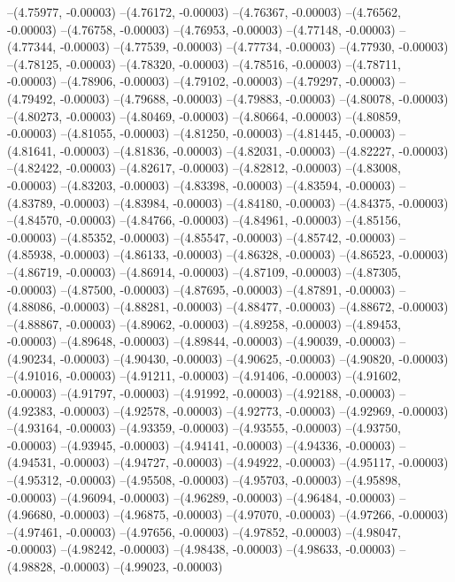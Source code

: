 --(4.75977, -0.00003)
--(4.76172, -0.00003)
--(4.76367, -0.00003)
--(4.76562, -0.00003)
--(4.76758, -0.00003)
--(4.76953, -0.00003)
--(4.77148, -0.00003)
--(4.77344, -0.00003)
--(4.77539, -0.00003)
--(4.77734, -0.00003)
--(4.77930, -0.00003)
--(4.78125, -0.00003)
--(4.78320, -0.00003)
--(4.78516, -0.00003)
--(4.78711, -0.00003)
--(4.78906, -0.00003)
--(4.79102, -0.00003)
--(4.79297, -0.00003)
--(4.79492, -0.00003)
--(4.79688, -0.00003)
--(4.79883, -0.00003)
--(4.80078, -0.00003)
--(4.80273, -0.00003)
--(4.80469, -0.00003)
--(4.80664, -0.00003)
--(4.80859, -0.00003)
--(4.81055, -0.00003)
--(4.81250, -0.00003)
--(4.81445, -0.00003)
--(4.81641, -0.00003)
--(4.81836, -0.00003)
--(4.82031, -0.00003)
--(4.82227, -0.00003)
--(4.82422, -0.00003)
--(4.82617, -0.00003)
--(4.82812, -0.00003)
--(4.83008, -0.00003)
--(4.83203, -0.00003)
--(4.83398, -0.00003)
--(4.83594, -0.00003)
--(4.83789, -0.00003)
--(4.83984, -0.00003)
--(4.84180, -0.00003)
--(4.84375, -0.00003)
--(4.84570, -0.00003)
--(4.84766, -0.00003)
--(4.84961, -0.00003)
--(4.85156, -0.00003)
--(4.85352, -0.00003)
--(4.85547, -0.00003)
--(4.85742, -0.00003)
--(4.85938, -0.00003)
--(4.86133, -0.00003)
--(4.86328, -0.00003)
--(4.86523, -0.00003)
--(4.86719, -0.00003)
--(4.86914, -0.00003)
--(4.87109, -0.00003)
--(4.87305, -0.00003)
--(4.87500, -0.00003)
--(4.87695, -0.00003)
--(4.87891, -0.00003)
--(4.88086, -0.00003)
--(4.88281, -0.00003)
--(4.88477, -0.00003)
--(4.88672, -0.00003)
--(4.88867, -0.00003)
--(4.89062, -0.00003)
--(4.89258, -0.00003)
--(4.89453, -0.00003)
--(4.89648, -0.00003)
--(4.89844, -0.00003)
--(4.90039, -0.00003)
--(4.90234, -0.00003)
--(4.90430, -0.00003)
--(4.90625, -0.00003)
--(4.90820, -0.00003)
--(4.91016, -0.00003)
--(4.91211, -0.00003)
--(4.91406, -0.00003)
--(4.91602, -0.00003)
--(4.91797, -0.00003)
--(4.91992, -0.00003)
--(4.92188, -0.00003)
--(4.92383, -0.00003)
--(4.92578, -0.00003)
--(4.92773, -0.00003)
--(4.92969, -0.00003)
--(4.93164, -0.00003)
--(4.93359, -0.00003)
--(4.93555, -0.00003)
--(4.93750, -0.00003)
--(4.93945, -0.00003)
--(4.94141, -0.00003)
--(4.94336, -0.00003)
--(4.94531, -0.00003)
--(4.94727, -0.00003)
--(4.94922, -0.00003)
--(4.95117, -0.00003)
--(4.95312, -0.00003)
--(4.95508, -0.00003)
--(4.95703, -0.00003)
--(4.95898, -0.00003)
--(4.96094, -0.00003)
--(4.96289, -0.00003)
--(4.96484, -0.00003)
--(4.96680, -0.00003)
--(4.96875, -0.00003)
--(4.97070, -0.00003)
--(4.97266, -0.00003)
--(4.97461, -0.00003)
--(4.97656, -0.00003)
--(4.97852, -0.00003)
--(4.98047, -0.00003)
--(4.98242, -0.00003)
--(4.98438, -0.00003)
--(4.98633, -0.00003)
--(4.98828, -0.00003)
--(4.99023, -0.00003)
